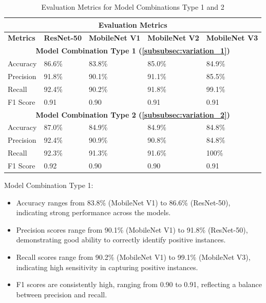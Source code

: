 \begin{table}[H]
\centering
\begin{tabularx}{\textwidth}{@{} *5{X} @{}}
\toprule
\multicolumn{5}{c}{\textbf{Evaluation Metrics}}                                    \\ \midrule
\addlinespace
\raggedright \textbf{Metrics}           & \textbf{ResNet-50} & \textbf{MobileNet V1} & \textbf{MobileNet V2} & \textbf{MobileNet V3} \\ \midrule
\multicolumn{5}{c}{\textbf{Model Combination Type 1 (\ref{subsubsec:variation_1})}}                                    \\ \midrule
Accuracy             &  86.6\%         &  83.8\%            &  85.0\%            &  84.9\%            \\ \midrule
Precision            &  91.8\%         &  90.1\%            &  91.1\%            &  85.5\%            \\ \midrule
Recall               &  92.4\%         &  90.2\%            &  91.8\%            &  99.1\%           \\ \midrule
F1 Score               &  0.91         &  0.90            &  0.91            &  0.91           \\ \midrule
\multicolumn{5}{c}{\textbf{Model Combination Type 2 (\ref{subsubsec:variation_2})}}                                    \\ \midrule
Accuracy             &  87.0\%         &   84.9\%           &  84.9\%             &  84.8\%            \\ \midrule
Precision            &  92.4\%         &   90.9\%           &  90.8\%            &   84.8\%           \\ \midrule
Recall               &  92.3\%         &   91.3\%           &  91.6\%            &   100\%          \\ \midrule
F1 Score               &  0.92         &  0.90            &  0.90           &  0.91           \\ 
\bottomrule
\end{tabularx}
\caption{Evaluation Metrics for Model Combinations Type 1 and 2 }
\label{table:results_2}
\end{table}

Model Combination Type 1:
\begin{itemize}
    \item Accuracy ranges from 83.8\% (MobileNet V1) to 86.6\% (ResNet-50), indicating strong performance across the models.
    \item Precision scores range from 90.1\% (MobileNet V1) to 91.8\% (ResNet-50), demonstrating good ability to correctly identify positive instances.
    \item Recall scores range from 90.2\% (MobileNet V1) to 99.1\% (MobileNet V3), indicating high sensitivity in capturing positive instances.
    \item F1 scores are consistently high, ranging from 0.90 to 0.91, reflecting a balance between precision and recall.
\end{itemize}

